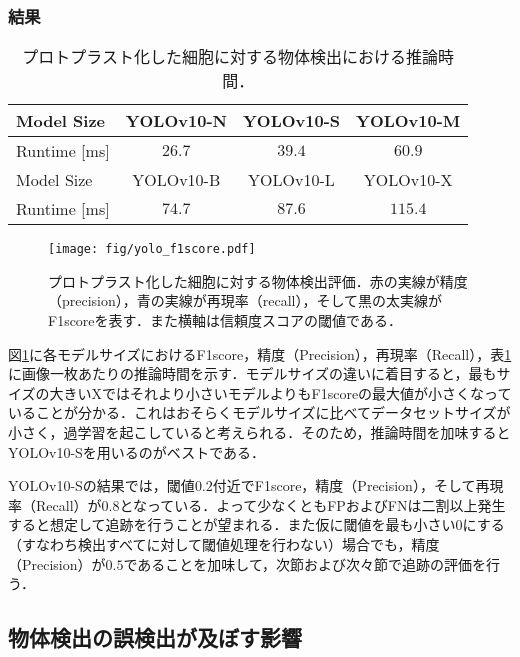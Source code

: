     \subsubsection{結果}

    \begin{table}[t]
        \centering
        \caption[プロトプラスト化した細胞に対する物体検出における推論時間]{プロトプラスト化した細胞に対する物体検出における推論時間．}
        \label{tab:yolo_runtime}
        \begin{tabular}{l|ccc}
            \hline Model Size & YOLOv10-N & YOLOv10-S & YOLOv10-M  
            \\\hline \hline Runtime [ms] & $26.7$ & $39.4$ & $60.9$ 
            \\ \hline Model Size & YOLOv10-B & YOLOv10-L & YOLOv10-X 
            \\ \hline \hline Runtime [ms] & $74.7$ & $87.6$ & $115.4$ 
        \end{tabular}
    \end{table}

    \begin{figure}[t]
        \centering
        \texttt{[image: fig/yolo\_f1score.pdf]}
        \caption[プロトプラスト化した細胞に対する物体検出評価]{プロトプラスト化した細胞に対する物体検出評価．赤の実線が精度（precision），青の実線が再現率（recall），そして黒の太実線がF1scoreを表す．また横軸は信頼度スコアの閾値である．}
        \label{fig:yolo_f1score}
    \end{figure}

    図\ref{fig:yolo_f1score}に各モデルサイズにおけるF1score，精度（Precision），再現率（Recall），表\ref{tab:yolo_runtime}に画像一枚あたりの推論時間を示す．モデルサイズの違いに着目すると，最もサイズの大きいXではそれより小さいモデルよりもF1scoreの最大値が小さくなっていることが分かる．これはおそらくモデルサイズに比べてデータセットサイズが小さく，過学習を起こしていると考えられる．そのため，推論時間を加味するとYOLOv10-Sを用いるのがベストである．

    YOLOv10-Sの結果では，閾値$0.2$付近でF1score，精度（Precision），そして再現率（Recall）が$0.8$となっている．よって少なくともFPおよびFNは二割以上発生すると想定して追跡を行うことが望まれる．また仮に閾値を最も小さい$0$にする（すなわち検出すべてに対して閾値処理を行わない）場合でも，精度（Precision）が$0.5$であることを加味して，次節および次々節で追跡の評価を行う．

    \subsection{物体検出の誤検出が及ぼす影響}
    \label{subsec:FPeffect}

